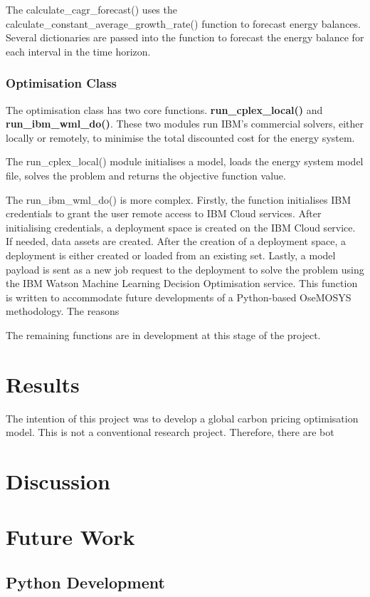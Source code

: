 \documentclass[12pt]{article}
\begin{document}
The calculate\_cagr\_forecast() uses the calculate\_constant\_average\_growth\_rate() function to forecast energy balances.
Several dictionaries are passed into the function to forecast the energy balance for each interval in the time horizon.

\subsubsection{Optimisation Class}
The optimisation class has two core functions. \textbf{run\_cplex\_local()} and \textbf{run\_ibm\_wml\_do()}.
These two modules run IBM's commercial solvers, either locally or remotely, to minimise the total discounted cost for the energy system.

The run\_cplex\_local() module initialises a model, loads the energy system model file, solves the problem and returns the objective function value.

The run\_ibm\_wml\_do() is more complex.
Firstly, the function initialises IBM credentials to grant the user remote access to IBM Cloud services.
After initialising credentials, a deployment space is created on the IBM Cloud service.
If needed, data assets are created.
After the creation of a deployment space, a deployment is either created or loaded from an existing set.
Lastly, a model payload is sent as a new job request to the deployment to solve the problem using the IBM Watson Machine Learning Decision Optimisation service.
This function is written to accommodate future developments of a Python-based OseMOSYS methodology. The reasons 

The remaining functions are in development at this stage of the project.

\newpage
\section{Results}
The intention of this project was to develop a global carbon pricing optimisation model.
This is not a conventional research project. Therefore, there are bot
\newpage
\section{Discussion}
\newpage
\section{Future Work}
\subsection{Python Development}
\end{document}
